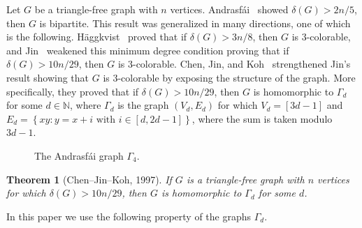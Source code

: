 \documentclass[a4paper,12pt]{article}
\newtheorem{theorem}{Theorem}
\newtheorem{proposition}[theorem]{Proposition}
\newcommand{\andrasfai}{Andrasf\'ai}
\begin{document}
Let \(G\) be a triangle-free graph with \(n\) vertices.
\andrasfai~\cite{andrasfal1964graphentheoretische} showed \(\delta(G) > 2n/5\),
then \(G\) is bipartite.
This result was generalized in many directions,
one of which is the following.
%
H{\"a}ggkvist~\cite{haggkvist1982odd} proved that if \(\delta(G) > 3n/8\), 
then \(G\) is \(3\)-colorable,
%
and Jin~\cite{jin1995triangle} weakened this minimum degree condition 
proving that if \(\delta(G) > 10n/29\), 
then \(G\) is \(3\)-colorable.
%
Chen, Jin, and Koh~\cite{chen1997triangle} strengthened Jin's result
showing that \(G\) is \(3\)-colorable by exposing the structure of the graph.
More specifically, they proved that if \(\delta(G) > 10n/29\),
then \(G\) is homomorphic to \(\Gamma_d\) for some \(d\in\mathbb{N}\),
where \(\Gamma_d\) is the graph \((V_d,E_d)\)
for which \(V_d = [3d-1]\) and \(E_d = \left\{xy : y = x + i \text{ with } i \in [d,2d-1]\right\}\),
where the sum is taken modulo \(3d-1\).

\begin{figure}[ht]
    \centering
        \centering
    \caption{The Andrasfái graph $\Gamma_4$.}
    \label{fig:andrasfai_graph}
\end{figure}

\begin{theorem}[Chen--Jin--Koh, 1997]\label{thm:ChenJinKoh}
	If \(G\) is a triangle-free graph with \(n\) vertices
	for which \(\delta(G) > 10n/29\),
	then \(G\) is homomorphic to \(\Gamma_d\) for some \(d\).
\end{theorem}

In this paper we use the following property of the graphs \(\Gamma_d\).

\end{document}
